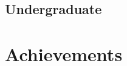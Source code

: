 \documentclass[letterpaper, 10pt]{deedy-resume} %
\begin{document}
{\begin{minipage}[t]{0.30\textwidth}
\subsection{Undergraduate}
\sectionspace %

\section{Achievements}
\sectionspace
\sectionspace
\sectionspace


\end{minipage}} \hspace{.5cm}%
%
%
\end{document}
